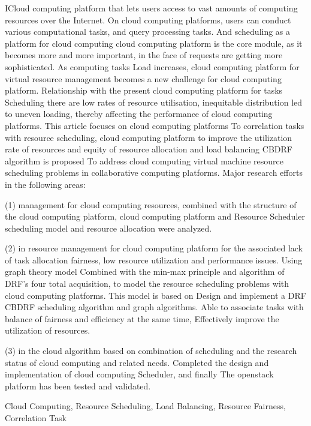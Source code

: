 \begin{eabstract}
ICloud computing platform that lets users access to vast amounts of computing resources over the Internet. On cloud computing platforms, users can conduct various computational tasks, and query processing tasks.
And scheduling as a platform for cloud computing cloud computing platform is the core module, as it becomes more and more important, in the face of requests are getting more sophisticated. As computing tasks
Load increases, cloud computing platform for virtual resource management becomes a new challenge for cloud computing platform. Relationship with the present cloud computing platform for tasks
Scheduling there are low rates of resource utilisation, inequitable distribution led to uneven loading, thereby affecting the performance of cloud computing platforms. This article focuses on cloud computing platforms
To correlation tasks with resource scheduling, cloud computing platform to improve the utilization rate of resources and equity of resource allocation and load balancing CBDRF algorithm is proposed
To address cloud computing virtual machine resource scheduling problems in collaborative computing platforms. Major research efforts in the following areas:

(1) management for cloud computing resources, combined with the structure of the cloud computing platform, cloud computing platform and Resource Scheduler scheduling model and resource allocation were analyzed.

(2) in resource management for cloud computing platform for the associated lack of task allocation fairness, low resource utilization and performance issues. Using graph theory model
Combined with the min-max principle and algorithm of DRF's four total acquisition, to model the resource scheduling problems with cloud computing platforms. This model is based on
Design and implement a DRF CBDRF scheduling algorithm and graph algorithms. Able to associate tasks with balance of fairness and efficiency at the same time,
Effectively improve the utilization of resources.

(3) in the cloud algorithm based on combination of scheduling and the research status of cloud computing and related needs. Completed the design and implementation of cloud computing Scheduler, and finally
The openstack platform has been tested and validated.


\end{eabstract}


\begin{ekeywords}
Cloud Computing, Resource Scheduling, Load Balancing, Resource Fairness, Correlation Task
\end{ekeywords}


